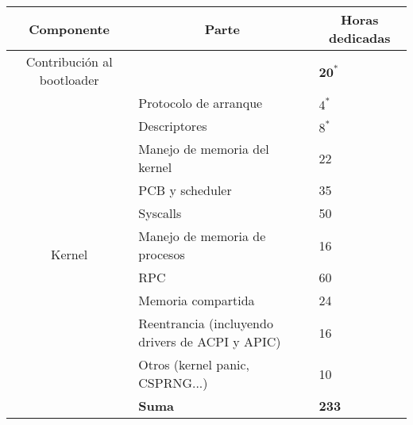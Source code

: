 \begin{table}[]

\begin{tabular}{|c|l|l|}
\hline
\textbf{Componente}                     & \multicolumn{1}{c|}{\textbf{Parte}}             & \multicolumn{1}{c|}{\textbf{Horas dedicadas}} \\ \hline
Contribución al bootloader              &                                                 & $\textbf{20}^*$                                  \\ \hline
\multirow{11}{*}{Kernel}                & Protocolo de arranque                           & $4^*$                                            \\ \cline{2-3} 
                                        & Descriptores                                    & $8^*$                                            \\ \cline{2-3} 
                                        & Manejo de memoria del kernel                    & 22                                            \\ \cline{2-3} 
                                        & PCB y scheduler                                 & 35                                            \\ \cline{2-3} 
                                        & Syscalls                                        & 50                                            \\ \cline{2-3} 
                                        & Manejo de memoria de procesos                   & 16                                            \\ \cline{2-3} 
                                        & RPC                                             & 60                                            \\ \cline{2-3} 
                                        & Memoria compartida                              & 24                                            \\ \cline{2-3} 
                                        & Reentrancia (incluyendo drivers de ACPI y APIC) & 16                                            \\ \cline{2-3} 
                                        & Otros (kernel panic, CSPRNG...)                 & 10                                            \\ \cline{2-3} 
                                        & \textbf{Suma}                                   & \textbf{233}                                  \\ \hline

\end{tabular}
\end{table}
